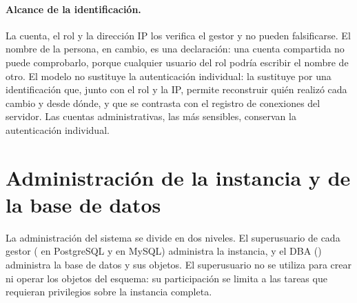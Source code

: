\paragraph{Alcance de la identificaci\'on.} La cuenta, el rol y la direcci\'on IP los verifica el gestor y no pueden falsificarse. El nombre de la persona, en cambio, es una declaraci\'on: una cuenta compartida no puede comprobarlo, porque cualquier usuario del rol podr\'ia escribir el nombre de otro. El modelo no sustituye la autenticaci\'on individual: la sustituye por una identificaci\'on que, junto con el rol y la IP, permite reconstruir qui\'en realiz\'o cada cambio y desde d\'onde, y que se contrasta con el registro de conexiones del servidor. Las cuentas administrativas, las m\'as sensibles, conservan la autenticaci\'on individual.

\section{Administraci\'on de la instancia y de la base de datos}
\label{sec:admin-instancia}

La administraci\'on del sistema se divide en dos niveles. El superusuario de cada gestor ( en PostgreSQL y  en MySQL) administra la instancia, y el DBA () administra la base de datos y sus objetos. El superusuario no se utiliza para crear ni operar los objetos del esquema: su participaci\'on se limita a las tareas que requieran privilegios sobre la instancia completa.

